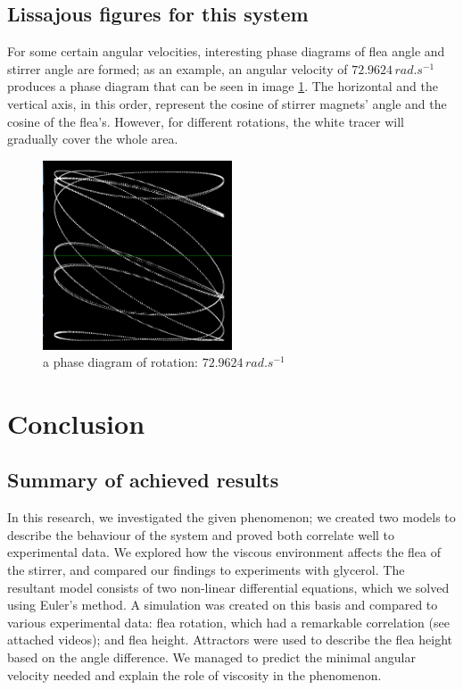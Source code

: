 \documentclass[10pt,a4paper]{article}
\begin{document}
\subsection{Lissajous figures for this system}
For some certain angular velocities, interesting phase diagrams of flea angle and stirrer angle are formed; as an example, an angular velocity of $72.9624 \, rad.s^{-1}$ produces a phase diagram that can be seen in image \ref{lissajus}. The horizontal and the vertical axis, in this order, represent the cosine of stirrer magnets' angle and the cosine of the flea's. However, for different rotations, the white tracer will gradually cover the whole area.

\begin{figure}[H]
  \centering
  \includegraphics[width=0.5\textwidth]{faz.png}
  \caption{a phase diagram of rotation: $72.9624 \, rad.s^{-1}$}
  \label{lissajus}
\end{figure}

\section{Conclusion}
\subsection{Summary of achieved results}
In this research, we investigated the given phenomenon; we created two models to describe the behaviour of the system and proved both correlate well to experimental data. We explored how the viscous environment affects the flea of the stirrer, and compared our findings to experiments with glycerol. The resultant model consists of two non-linear differential equations, which we solved using Euler's method. A simulation was created on this basis and compared to various experimental data: flea rotation, which had a remarkable correlation (see attached videos); and flea height. Attractors were used to describe the flea height based on the angle difference. We managed to predict the minimal angular velocity needed and explain the role of viscosity in the phenomenon.
\end{document}
